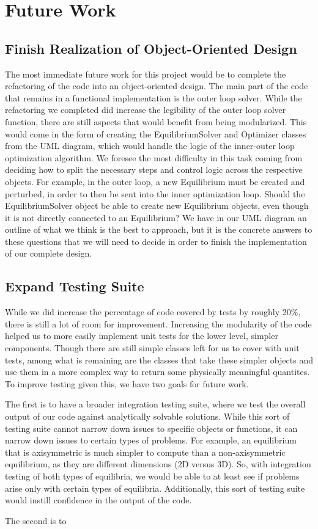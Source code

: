 \documentclass{article}
\begin{document}
\section{Future Work}

\subsection{Finish Realization of Object-Oriented Design}
The most immediate future work for this project would be to complete the refactoring of the code into an object-oriented design.
The main part of the code that remains in a functional implementation is the outer loop solver.
While the refactoring we completed did increase the legibility of the outer loop solver function, there are still aspects that would benefit from being modularized.
This would come in the form of creating the EquilibriumSolver and Optimizer classes from the UML diagram, which would handle the logic of the inner-outer loop optimization algorithm.
We foresee the most difficulty in this task coming from deciding how to split the necessary steps and control logic across the respective objects.
For example, in the outer loop, a new Equilibrium must be created and perturbed, in order to then be sent into the inner optimization loop.
Should the EquilibriumSolver object be able to create new Equilibrium objects, even though it is not directly connected to an Equilibrium?
We have in our UML diagram an outline of what we think is the best to approach, but it is the concrete answers to these questions that we will need to decide in order to finish the implementation of our complete design.

\subsection{Expand Testing Suite}
While we did increase the percentage of code covered by tests by roughly 20\%, there is still a lot of room for improvement.
Increasing the modularity of the code helped us to more easily implement unit tests for the lower level, simpler components.
Though there are still simple classes left for us to cover with unit tests, among what is remaining are the classes that take these simpler objects and use them in a more complex way to return some physically meaningful quantites.
To improve testing given this, we have two goals for future work. 

The first is to have a broader integration testing suite, where we test the overall output of our code against analytically solvable solutions.
While this sort of testing suite cannot narrow down issues to specific objects or functions, it can narrow down issues to certain types of problems.
For example, an equilibrium that is axisymmetric is much simpler to compute than a non-axisymmetric equilibrium, as they are different dimensions (2D versus 3D).
So, with integration testing of both types of equilibria, we would be able to at least see if problems arise only with certain types of equilibria.
Additionally, this sort of testing suite would instill confidence in the output of the code.

The second is to 


\end{document}
